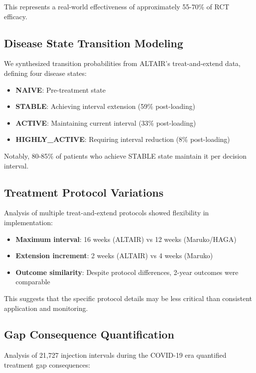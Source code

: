 This represents a real-world effectiveness of approximately 55-70\% of RCT efficacy.

\subsection{Disease State Transition Modeling}

We synthesized transition probabilities from ALTAIR's treat-and-extend data, defining four disease states:

\begin{itemize}
    \item \textbf{NAIVE}: Pre-treatment state
    \item \textbf{STABLE}: Achieving interval extension (59\% post-loading)
    \item \textbf{ACTIVE}: Maintaining current interval (33\% post-loading)
    \item \textbf{HIGHLY\_ACTIVE}: Requiring interval reduction (8\% post-loading)
\end{itemize}

Notably, 80-85\% of patients who achieve STABLE state maintain it per decision interval.

\subsection{Treatment Protocol Variations}

Analysis of multiple treat-and-extend protocols showed flexibility in implementation:

\begin{itemize}
    \item \textbf{Maximum interval}: 16 weeks (ALTAIR) vs 12 weeks (Maruko/HAGA)
    \item \textbf{Extension increment}: 2 weeks (ALTAIR) vs 4 weeks (Maruko)
    \item \textbf{Outcome similarity}: Despite protocol differences, 2-year outcomes were comparable
\end{itemize}

This suggests that the specific protocol details may be less critical than consistent application and monitoring.

\subsection{Gap Consequence Quantification}

Analysis of 21,727 injection intervals during the COVID-19 era quantified treatment gap consequences:

